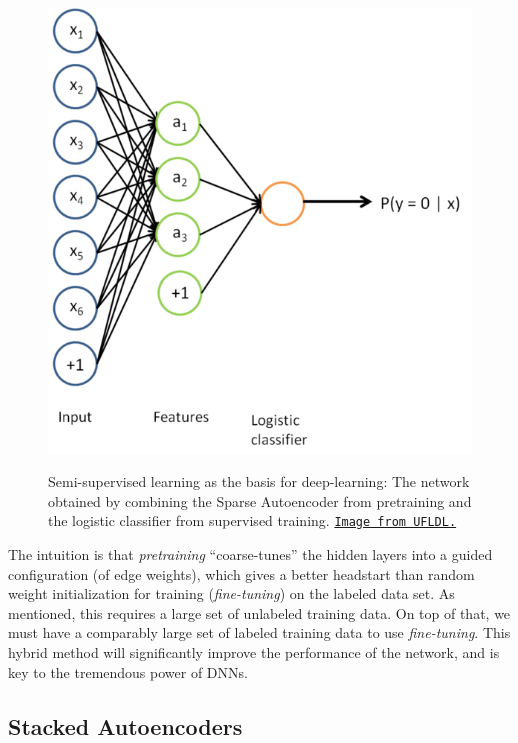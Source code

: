 \documentclass[12pt]{article}  %
\begin{document}
\begin{figure}[ht]
\centering
\includegraphics[scale=0.8]{images/CombinedAE.png}\\
\caption{Semi-supervised learning as the basis for deep-learning: The network obtained by combining the Sparse Autoencoder from pretraining and the logistic classifier from supervised training. \href{http://deeplearning.stanford.edu/wiki/index.php/Self-Taught_Learning_to_Deep_Networks}{\tt Image from UFLDL.}}\label{combinedAE-fig}
\end{figure}


The intuition is that \emph{pretraining} ``coarse-tunes'' the hidden layers into a guided configuration (of edge weights), which gives a better headstart than random weight initialization for training (\emph{fine-tuning}) on the labeled data set. As mentioned, this requires a large set of unlabeled training data. On top of that, we must have a comparably large set of labeled training data to use \emph{fine-tuning}. This hybrid method will significantly improve the performance of the network, and is key to the tremendous power of DNNs.






\subsection{Stacked Autoencoders}
\end{document}
